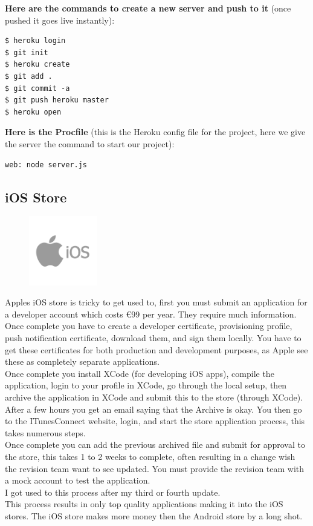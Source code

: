 \textbf{Here are the commands to create a new server and push to it} (once pushed it goes live instantly):
\begin{verbatim}
$ heroku login
$ git init
$ heroku create
$ git add .
$ git commit -a
$ git push heroku master
$ heroku open
\end{verbatim}

\textbf{Here is the Procfile} (this is the Heroku config file for the project, here we give the server the command to start our project):
\begin{verbatim}
web: node server.js
\end{verbatim}

\subsection{iOS Store}
\begin{figure}
	\includegraphics[width=3cm]{img/mobile-app/logos/ios.png}
\end{figure} 
Apples iOS store \cite{ios} is tricky to get used to, first you must submit an application for a developer account which costs €99 per year. They require much information. Once complete you have to create a developer certificate, provisioning profile, push notification certificate, download them, and sign them locally. You have to get these certificates for both production and development purposes, as Apple see these as completely separate applications.
\\

Once complete you install XCode (for developing iOS apps), compile the application, login to your profile in XCode, go through the local setup, then archive the application in XCode and submit this to the store (through XCode). After a few hours you get an email saying that the Archive is okay. You then go to the ITunesConnect website, login, and start the store application process, this takes numerous steps.
\\
Once complete you can add the previous archived file and submit for approval to the store, this takes 1 to 2 weeks to complete, often resulting in a change wish the revision team want to see updated. You must provide the revision team with a mock account to test the application.
\\
I got used to this process after my third or fourth update.
\\
This process results in only top quality applications making it into the iOS stores.
The iOS store makes more money then the Android store by a long shot.

